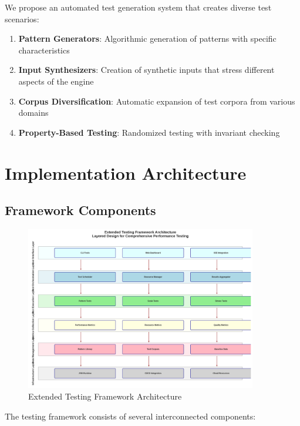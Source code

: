 \documentclass[11pt,a4paper]{article}
\begin{document}
We propose an automated test generation system that creates diverse test scenarios:

\begin{enumerate}
    \item \textbf{Pattern Generators}: Algorithmic generation of patterns with specific characteristics
    \item \textbf{Input Synthesizers}: Creation of synthetic inputs that stress different aspects of the engine
    \item \textbf{Corpus Diversification}: Automatic expansion of test corpora from various domains
    \item \textbf{Property-Based Testing}: Randomized testing with invariant checking
\end{enumerate}

\section{Implementation Architecture}

\subsection{Framework Components}

\begin{figure}[H]
\centering
\includegraphics[width=0.9\textwidth]{illustrations/testing_architecture.png}
\caption{Extended Testing Framework Architecture}
\label{fig:architecture}
\end{figure}

The testing framework consists of several interconnected components:
\end{document}
